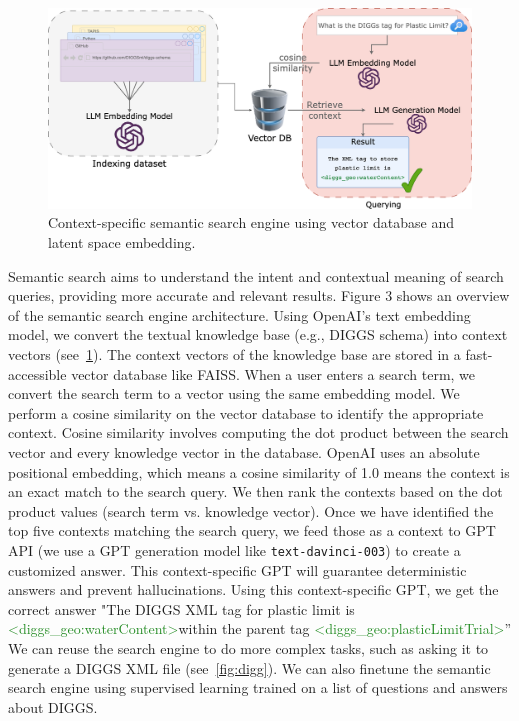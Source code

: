 \documentclass{article}
\begin{document}
\begin{figure}[ht]
    \centering
    \includegraphics[width = 0.8\linewidth]{figs/semantic-search.png}
    \caption{Context-specific semantic search engine using vector database and latent space embedding.
    \label{fig:semantic-search}
}
\end{figure}
Semantic search aims to understand the intent and contextual meaning of search queries, providing more accurate and relevant results. Figure 3 shows an overview of the semantic search engine architecture. Using OpenAI's text embedding model, we convert the textual knowledge base (e.g., DIGGS schema) into context vectors (see~\cref{fig:semantic-search}). The context vectors of the knowledge base are stored in a fast-accessible vector database like FAISS. When a user enters a search term, we convert the search term to a vector using the same embedding model. We perform a cosine similarity on the vector database to identify the appropriate context. Cosine similarity involves computing the dot product between the search vector and every knowledge vector in the database. OpenAI uses an absolute positional embedding, which means a cosine similarity of 1.0 means the context is an exact match to the search query. We then rank the contexts based on the dot product values (search term vs. knowledge vector). Once we have identified the top five contexts matching the search query, we feed those as a context to GPT API (we use a GPT generation model like \verb|text-davinci-003|) to create a customized answer. This context-specific GPT will guarantee deterministic answers and prevent hallucinations. Using this context-specific GPT, we get the correct answer "The DIGGS XML tag for plastic limit is \textcolor{ForestGreen}{\textless diggs\_geo:waterContent\textgreater}within the parent tag \textcolor{ForestGreen}{\textless diggs\_geo:plasticLimitTrial\textgreater}” We can reuse the search engine to do more complex tasks, such as asking it to generate a DIGGS XML file (see~\cref{fig:digg}). We can also finetune the semantic search engine using supervised learning trained on a list of questions and answers about DIGGS. 
\end{document}
